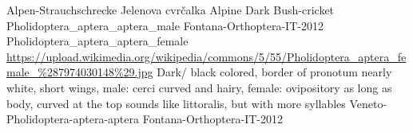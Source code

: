 {Alpen-Strauchschrecke} %
{Jelenova cvr\v{c}alka} %
{Alpine Dark Bush-cricket} %
{Pholidoptera_aptera_aptera_male} %
{Fontana-Orthoptera-IT-2012}%
{Pholidoptera_aptera_aptera_female} %
{\url{https://upload.wikimedia.org/wikipedia/commons/5/55/Pholidoptera_aptera_female_\%287974030148\%29.jpg}} %
{Dark/ black colored, border of pronotum nearly white, short wings, male: cerci curved and hairy, female: ovipository as long as body, curved at the top} %
{sounds like littoralis, but with more syllables} %
{Veneto-Pholidoptera-aptera-aptera} %
{Fontana-Orthoptera-IT-2012}%
